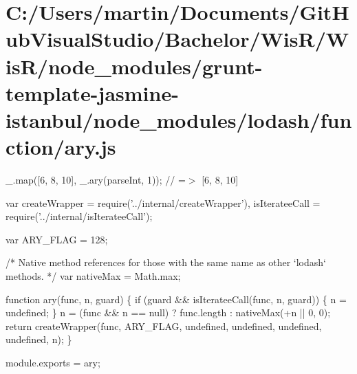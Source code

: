 \hypertarget{_c_1_2_users_2martin_2_documents_2_git_hub_visual_studio_2_bachelor_2_wis_r_2_wis_r_2node_module8963c873b48ccfdde42af7824c43afcb}{}\section{C\+:/\+Users/martin/\+Documents/\+Git\+Hub\+Visual\+Studio/\+Bachelor/\+Wis\+R/\+Wis\+R/node\+\_\+modules/grunt-\/template-\/jasmine-\/istanbul/node\+\_\+modules/lodash/function/ary.\+js}
\+\_\+.\+map(\mbox{[}\textquotesingle{}6\textquotesingle{}, \textquotesingle{}8\textquotesingle{}, \textquotesingle{}10\textquotesingle{}\mbox{]}, \+\_\+.\+ary(parse\+Int, 1)); // =$>$ \mbox{[}6, 8, 10\mbox{]}


\begin{DoxyCodeInclude}
var createWrapper = require(\textcolor{stringliteral}{'../internal/createWrapper'}),
    isIterateeCall = require(\textcolor{stringliteral}{'../internal/isIterateeCall'});

var ARY\_FLAG = 128;

\textcolor{comment}{/* Native method references for those with the same name as other `lodash` methods. */}
var nativeMax = Math.max;

\textcolor{keyword}{function} ary(func, n, guard) \{
  \textcolor{keywordflow}{if} (guard && isIterateeCall(func, n, guard)) \{
    n = undefined;
  \}
  n = (func && n == null) ? func.length : nativeMax(+n || 0, 0);
  \textcolor{keywordflow}{return} createWrapper(func, ARY\_FLAG, undefined, undefined, undefined, undefined, n);
\}

module.exports = ary;
\end{DoxyCodeInclude}
 